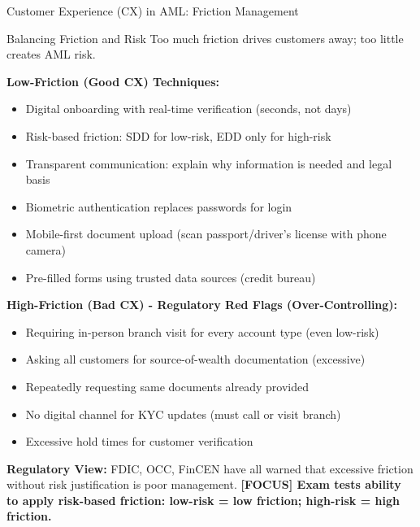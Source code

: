 \documentclass[11pt,a4paper]{beamer}
\newcommand{\examfocus}[1]{\textcolor{orange!80!black}{\textbf{[FOCUS] #1}}}
\begin{document}
\begin{frame}{Customer Experience (CX) in AML: Friction Management}
	\begin{block}{Balancing Friction and Risk}
		Too much friction drives customers away; too little creates AML risk.
	\end{block}
	\textbf{Low-Friction (Good CX) Techniques:}
	\begin{itemize}
		\item Digital onboarding with real-time verification (seconds, not days)
		\item Risk-based friction: SDD for low-risk, EDD only for high-risk
		\item Transparent communication: explain why information is needed and legal basis
		\item Biometric authentication replaces passwords for login
		\item Mobile-first document upload (scan passport/driver's license with phone camera)
		\item Pre-filled forms using trusted data sources (credit bureau)
	\end{itemize}
	\textbf{High-Friction (Bad CX) - Regulatory Red Flags (Over-Controlling):}
	\begin{itemize}
		\item Requiring in-person branch visit for every account type (even low-risk)
		\item Asking all customers for source-of-wealth documentation (excessive)
		\item Repeatedly requesting same documents already provided
		\item No digital channel for KYC updates (must call or visit branch)
		\item Excessive hold times for customer verification
	\end{itemize}
	\textbf{Regulatory View:} FDIC, OCC, FinCEN have all warned that excessive friction without risk justification is poor management.
	\examfocus{Exam tests ability to apply risk-based friction: low-risk = low friction; high-risk = high friction.}
\end{frame}

\end{document}
